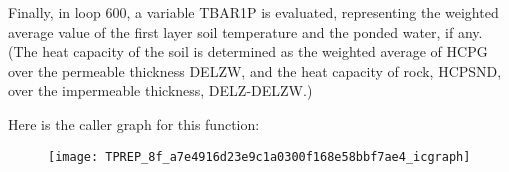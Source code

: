 Finally, in loop 600, a variable T\+B\+A\+R1\+P is evaluated, representing the weighted average value of the first layer soil temperature and the ponded water, if any. (The heat capacity of the soil is determined as the weighted average of H\+C\+P\+G over the permeable thickness D\+E\+L\+Z\+W, and the heat capacity of rock, H\+C\+P\+S\+N\+D, over the impermeable thickness, D\+E\+L\+Z-\/\+D\+E\+L\+Z\+W.)

Here is the caller graph for this function\+:\nopagebreak
\begin{figure}[H]
\begin{center}
\leavevmode
\texttt{[image: TPREP\_8f\_a7e4916d23e9c1a0300f168e58bbf7ae4\_icgraph]}
\end{center}
\end{figure}


